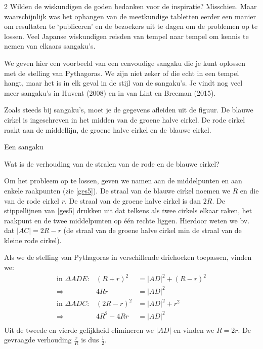 \begin{multicols}{2}
Wilden de wiskundigen de goden bedanken voor de inspiratie? Misschien. Maar waarschijnlijk was het ophangen van de meetkundige tabletten eerder een manier om resultaten te `publiceren’ en de bezoekers uit te dagen om de
problemen op te lossen. Veel Japanse wiskundigen reisden van tempel naar tempel om kennis te nemen van elkaars sangaku’s.

We geven hier een voorbeeld van een eenvoudige sangaku die je kunt oplossen met de stelling van Pythagoras. We zijn niet zeker of die echt in een tempel hangt, maar het is in elk geval in de stijl van de sangaku's. Je vindt nog veel meer sangaku's in Huvent (2008) en in van Lint en Breeman (2015).

Zoals steeds bij sangaku's, moet je de gegevens afleiden uit de figuur. De blauwe cirkel is ingeschreven in het midden van de groene halve cirkel. De rode cirkel raakt aan de middellijn, de groene halve cirkel en de blauwe cirkel.

\begin{kader}{Een sangaku}{}

    Wat is de verhouding van de stralen van de rode en de blauwe cirkel?

    
\end{kader}

Om het probleem op te lossen, geven we namen aan de middelpunten en aan enkele raakpunten (zie \autoref{ges5}). De straal van de blauwe cirkel noemen we $R$ en die van de rode cirkel $r$. De straal van de groene halve cirkel is dan $2R$. De stippellijnen van \autoref{ges5} drukken uit dat telkens als twee cirkels elkaar raken, het raakpunt en de twee middelpunten op één rechte liggen. Hierdoor weten we bv. dat $|AC|=2R-r$ (de straal van de groene halve cirkel min de straal van de kleine rode cirkel).


Als we de stelling van Pythagoras in verschillende driehoeken toepassen, vinden we:
\[
\begin{array}{lrl}
    \text{in }\Delta ADE: &(R+r)^2  &=|AD|^2+(R-r)^2 \\
    \Rightarrow &4Rr      &=|AD|^2\\
    \text{in }\Delta ADC: &(2R-r)^2 &=|AD|^2+r^2\\
    \Rightarrow &4R^2-4Rr &=|AD|^2\\
\end{array}
\]
Uit de tweede en vierde gelijkheid elimineren we \(|AD|\) en vinden we \(R = 2r\).
De gevraagde verhouding $\frac{r}{R}$ is dus $\frac{1}{2}$.


\end{multicols}
